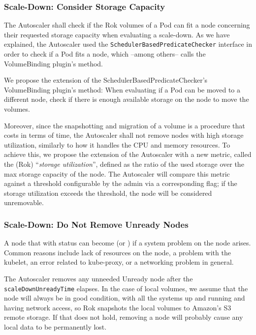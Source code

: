 \label{section:design-autoscaler-guards}


\subsubsection{Scale-Down: Consider Storage Capacity}

The Autoscaler shall check if the Rok volumes of a Pod can fit a node concerning
their requested storage capacity when evaluating a scale-down. As we have
explained, the Autoscaler used the \texttt{SchedulerBasedPredicateChecker}
interface in order to check if a Pod fits a node, which --among others-- calls
the VolumeBinding plugin's  method.

We propose the extension of the SchedulerBasedPredicateChecker's VolumeBinding
plugin's  method: When evaluating if a Pod can be moved to a
different node, check if there is enough available storage on the node to move
the volumes.

Moreover, since the snapshotting and migration of a volume is a procedure that
costs in terms of time, the  Autoscaler shall not remove nodes with high storage
utilization, similarly to how it handles the CPU and memory resources. To
achieve this, we propose the extension of the Autoscaler with a new metric,
called the (Rok) ``\textit{storage utilization}'', defined as the ratio of the
used storage over the max storage capacity of the node. The Autoscaler will
compare this metric against a threshold configurable by the admin via a
corresponding flag; if the storage utilization exceeds the threshold, the node
will be considered unremovable.

\subsubsection{Scale-Down: Do Not Remove Unready Nodes}

A node that with status  can become  (or ) if
a system problem on the node arises. Common reasons include lack of resources on
the node, a problem with the kubelet, an error related to kube-proxy, or a
networking problem in general.

The Autoscaler removes any unneeded Unready node after the
\texttt{scaleDownUnreadyTime} elapses. In the case of local volumes, we assume
that the node will always be in good condition, with all the systems up and
running and having network access, so Rok snapshots the local volumes to
Amazon's S3 remote storage. If that does not hold, removing a node will probably
cause any local data to be permanently lost.

